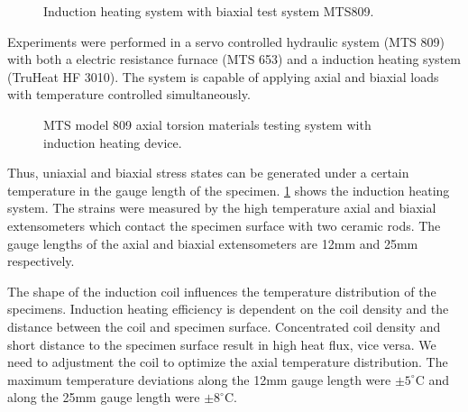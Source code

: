 


\begin{figure}[!htp]
\centering{}
\caption{Induction heating system with biaxial test system MTS809.}
\label{Fig:Equipment}
\end{figure}

Experiments were performed in a servo controlled hydraulic system (MTS 809) with both a electric resistance furnace (MTS 653) and a induction heating system (TruHeat HF 3010).
The system is capable of applying axial and biaxial loads with temperature controlled simultaneously.
\begin{figure}[!htp]
\centering{}
\caption{MTS model 809 axial torsion materials testing system with induction heating device.}
\label{Fig:MTS809}
\end{figure}
Thus, uniaxial and biaxial stress states can be generated under a certain temperature in the gauge length of the specimen.
\ref{Fig:Equipment} shows the induction heating system.
The strains were measured by the high temperature axial and biaxial extensometers which contact the specimen surface with two ceramic rods.
The gauge lengths of the axial and biaxial extensometers are 12mm and 25mm respectively.

The shape of the induction coil influences the temperature distribution of the specimens.
Induction heating efficiency is dependent on the coil density and the distance between the coil and specimen surface.
Concentrated coil density and short distance to the specimen surface result in high heat flux, vice versa.
We need to adjustment the coil to optimize the axial temperature distribution.
The maximum temperature deviations along the 12mm gauge length were $\pm5^{\circ}$C and along the 25mm gauge length were $\pm8^{\circ}$C.



